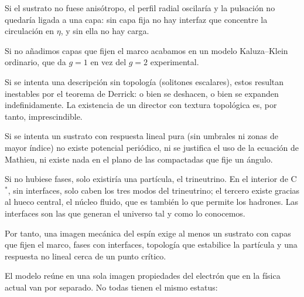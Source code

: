 \documentclass[11pt,a4paper]{article}
\newcommand{\Cst}{C\ensuremath{^{*}}}
\begin{document}
Si el sustrato no fuese anisótropo, el perfil radial oscilaría y la pulsación no quedaría ligada a una capa: sin capa fija no hay interfaz que concentre la circulación en $\eta$, y sin ella no hay carga.

Si no añadimos capas que fijen el marco acabamos en un modelo Kaluza--Klein ordinario, que da $g=1$ en vez del $g=2$ experimental.

Si se intenta una descripción sin topología (solitones escalares), estos resultan inestables por el teorema de Derrick: o bien se deshacen, o bien se expanden indefinidamente. La existencia de un director con textura topológica es, por tanto, imprescindible.

Si se intenta un sustrato con respuesta lineal pura (sin umbrales ni zonas de mayor índice) no existe potencial periódico, ni se justifica el uso de la ecuación de Mathieu, ni existe nada en el plano de las compactadas que fije un ángulo.

Si no hubiese fases, solo existiría una partícula, el trineutrino. En el interior de \Cst, sin interfaces, solo caben los tres modos del trineutrino; el tercero existe gracias al hueco central, el núcleo fluido, que es también lo que permite los hadrones. Las interfaces son las que generan el universo tal y como lo conocemos.

Por tanto, una imagen mecánica del espín exige al menos un sustrato con capas que fijen el marco, fases con interfaces, topología que estabilice la partícula y una respuesta no lineal cerca de un punto crítico.

El modelo reúne en una sola imagen propiedades del electrón que en la física actual van por separado. No todas tienen el mismo estatus:
\end{document}
